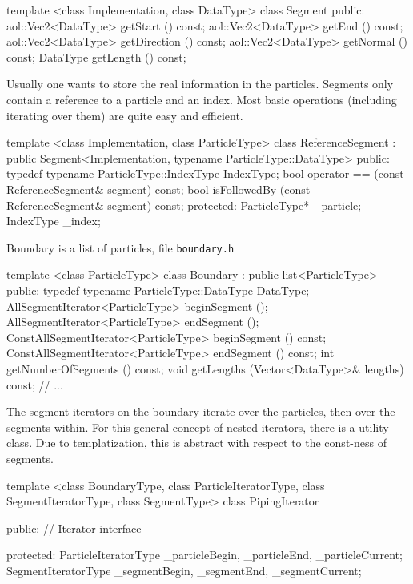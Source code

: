 \begin{myverbatim}
template <class Implementation, class DataType>
  class Segment {
  public:
    aol::Vec2<DataType> getStart () const;
    aol::Vec2<DataType> getEnd () const;
    aol::Vec2<DataType> getDirection () const;
    aol::Vec2<DataType> getNormal () const;
    DataType getLength () const;
}
\end{myverbatim}



Usually one wants to store the real information in the particles.
Segments only contain a reference to a particle and an index. Most basic operations (including iterating
over them) are quite easy and efficient.

\begin{myverbatim}
template <class Implementation, class ParticleType>
  class ReferenceSegment
  : public Segment<Implementation,
   typename ParticleType::DataType> {
  public:
    typedef typename ParticleType::IndexType IndexType;
    bool operator == (const ReferenceSegment& segment) const;
    bool isFollowedBy (const ReferenceSegment& segment) const;
  protected:
    ParticleType* _particle;
    IndexType _index;
}
\end{myverbatim}



Boundary is a list of particles, file \lstinline$boundary.h$

\begin{myverbatim}
template <class ParticleType>
  class Boundary
  : public list<ParticleType> {
  public:
    typedef typename ParticleType::DataType DataType;
    AllSegmentIterator<ParticleType> beginSegment ();
    AllSegmentIterator<ParticleType> endSegment ();
    ConstAllSegmentIterator<ParticleType> beginSegment () const;
    ConstAllSegmentIterator<ParticleType> endSegment () const;
    int getNumberOfSegments () const;
    void getLengths (Vector<DataType>& lengths) const;
    // ...
}
\end{myverbatim}



The segment iterators on the boundary iterate over the particles, then over the segments
within. For this general concept of nested iterators, there is a utility class. Due to templatization, this is abstract
with respect to the const-ness of segments.

\begin{myverbatim}
template <class BoundaryType, class ParticleIteratorType,
 class SegmentIteratorType, class SegmentType>
  class PipingIterator {
  public:
    // Iterator interface

  protected:
    ParticleIteratorType _particleBegin,
                         _particleEnd, _particleCurrent;
    SegmentIteratorType _segmentBegin,
                        _segmentEnd, _segmentCurrent;
}
\end{myverbatim}




